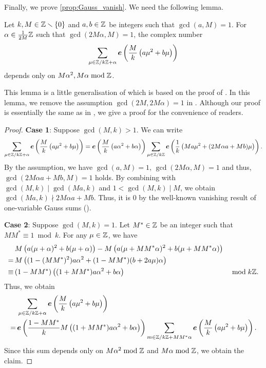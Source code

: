 \documentclass[11pt,a4paper,lualatex]{amsart}
\numberwithin{equation}{section} %
\begin{document}
Finally, we prove \cref{prop:Gauss_vanish}. 
We need the following lemma.

\begin{lem} \label{lem:Gauss_sum_indep}
	Let $ k, M \in \mathbb{Z} \smallsetminus \{ 0 \} $ and $ a, b \in \mathbb{Z} $ be integers such that $ \gcd(a, M) = 1 $.
	For $ \alpha \in \frac{1}{2M}\mathbb{Z} $ such that $ \gcd(2M \alpha, M) = 1 $, the complex number 
	\[
	\sum_{\mu \in \mathbb{Z}/k\mathbb{Z} + \alpha} \bm{e} \left( \frac{M}{k} \left( a \mu^2 + b \mu \right) \right)
	\]
	depends only on $ M\alpha^2, M\alpha \bmod \mathbb{Z} $. 
\end{lem}

This lemma is a little generalisation of \cite[Lemma 4.7 and 4.8]{MM} which is based on the proof of \cite[Theorem 4.1]{BMM_high_depth}.
In this lemma, we remove the assumption $ \gcd(2M, 2M \alpha) = 1 $ in \cite[Lemma 4.7 and 4.8]{MM}.
Although our proof is essentially the same as in \cite[Lemma 4.7 and 4.8]{MM}, we give a proof for the convenience of readers.

\begin{proof}
	\textbf{Case 1}: Suppose $ \gcd(M, k) > 1 $.
	We can write
	\[
	\sum_{\mu \in \mathbb{Z}/k\mathbb{Z} + \alpha} \bm{e} \left( \frac{M}{k} \left( a \mu^2 + b \mu \right) \right)
	=
	\bm{e} \left( \frac{M}{k} \left( a \alpha^2 + b \alpha \right) \right)
	\sum_{\mu \in \mathbb{Z}/k\mathbb{Z}} \bm{e} \left( \frac{1}{k} \left( Ma \mu^2 + (2M \alpha a + Mb) \mu \right) \right).
	\]
	By the assumption, we have $ \gcd(a, M) = 1, \, \gcd(2M \alpha, M) = 1 $ and thus, $ \gcd(2M \alpha a + Mb, M) = 1 $ holds.
	By combining with $ \gcd(M, k) \mid \gcd(Ma, k) $ and $ 1 < \gcd(M, k) \mid M $, we obtain $ \gcd(Ma, k) \nmid 2M \alpha a + Mb $. 
	Thus, it is $ 0 $ by the well-known vanishing result of one-variable Gauss sums (\cite[Lemma 4.3]{MM}).
	
	\textbf{Case 2}: Suppose $ \gcd(M, k) = 1 $.
	Let $ M^* \in \mathbb{Z} $ be an integer such that $ MM^* \equiv 1 \bmod k $.
	For any $ \mu \in \mathbb{Z} $, we have
	\begin{align}
		&M \left( a (\mu + \alpha)^2 + b (\mu + \alpha) \right)
		- M \left( a (\mu + M M^* \alpha)^2 + b (\mu + M M^* \alpha) \right) & & \\
		= \,
		&M \left( (1 - (MM^*)^2) a \alpha^2 + (1 - M M^*) (b + 2a \mu) \alpha \right) & & \\
		\equiv \,
		&(1 - M M^*) \left( (1 + MM^*) a \alpha^2 + b \alpha \right) & &\bmod k\mathbb{Z}.
	\end{align}
	Thus, we obtain
	\begin{align}
		&\sum_{\mu \in \mathbb{Z}/k\mathbb{Z} + \alpha} \bm{e} \left( \frac{M}{k} \left( a \mu^2 + b \mu \right) \right)\\
		= \,
		&\bm{e} \left( \frac{1 - M M^*}{k}  M  \left( (1 + MM^*) a \alpha^2 + b \alpha \right) \right)
		\sum_{m \in \mathbb{Z}/k\mathbb{Z} + M M^* \alpha} \bm{e}\left( \frac{M}{k} \left( a \mu^2 + b \mu \right) \right).
	\end{align}
	Since this sum depends only on $ M\alpha^2 \bmod \mathbb{Z} $ and $ M\alpha \bmod \mathbb{Z} $, we obtain the claim.
\end{proof}
\end{document}
